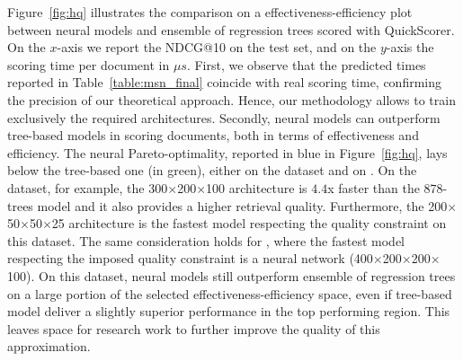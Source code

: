 Figure~\ref{fig:hq} illustrates the comparison on a effectiveness-efficiency plot between neural models and ensemble of regression trees scored with QuickScorer. On the $x$-axis we report the NDCG@10 on the test set, and on the $y$-axis the scoring time per document in $\mu s$. First, we observe that the predicted times reported in Table~\ref{table:msn_final} coincide with real scoring time, confirming the precision of our theoretical approach. Hence, our methodology allows to train exclusively the required architectures. Secondly, neural models can outperform tree-based models in scoring documents, both in terms of effectiveness and efficiency. The neural Pareto-optimality, reported in blue in  Figure~\ref{fig:hq}, lays below the tree-based one (in green), either on the \msn dataset and on \istella. On the \msn dataset, for example, the 300$\times$200$\times$100 architecture is $4.4$x faster than the $878$-trees model and it also provides a higher retrieval quality. Furthermore, the 200$\times$50$\times$50$\times$25 architecture is the fastest model respecting the quality constraint on this dataset. The same consideration holds for \istella, where the fastest model respecting the imposed quality constraint is a neural network (400$\times$200$\times$200$\times$100).
On this dataset, neural models still outperform ensemble of regression trees on a large portion of the selected effectiveness-efficiency space, even if tree-based model deliver a slightly superior performance in the top performing region.
This leaves space for research work to further improve the quality of this approximation. 


